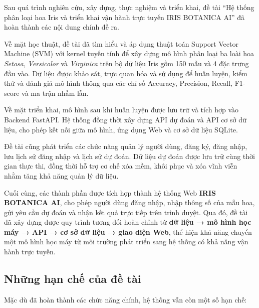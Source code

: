 \documentclass[14pt]{extarticle}
\begin{document}
\noindent Sau quá trình nghiên cứu, xây dựng, thực nghiệm và triển khai, đề tài ``Hệ thống phân loại hoa Iris và triển khai vận hành trực tuyến IRIS BOTANICA AI'' đã hoàn thành các nội dung chính đề ra.

\noindent Về mặt học thuật, đề tài đã tìm hiểu và áp dụng thuật toán Support Vector Machine (SVM) với kernel tuyến tính để xây dựng mô hình phân loại ba loài hoa \textit{Setosa}, \textit{Versicolor} và \textit{Virginica} trên bộ dữ liệu Iris gồm 150 mẫu và 4 đặc trưng đầu vào. Dữ liệu được khảo sát, trực quan hóa và sử dụng để huấn luyện, kiểm thử và đánh giá mô hình thông qua các chỉ số Accuracy, Precision, Recall, F1-score và ma trận nhầm lẫn.

\noindent Về mặt triển khai, mô hình sau khi huấn luyện được lưu trữ và tích hợp vào Backend FastAPI. Hệ thống đồng thời xây dựng API dự đoán và API cơ sở dữ liệu, cho phép kết nối giữa mô hình, ứng dụng Web và cơ sở dữ liệu SQLite.

\noindent Đề tài cũng phát triển các chức năng quản lý người dùng, đăng ký, đăng nhập, lưu lịch sử đăng nhập và lịch sử dự đoán. Dữ liệu dự đoán được lưu trữ cùng thời gian thực thi, đồng thời hỗ trợ cơ chế xóa mềm, khôi phục và xóa vĩnh viễn nhằm tăng khả năng quản lý dữ liệu.

\noindent Cuối cùng, các thành phần được tích hợp thành hệ thống Web \textbf{IRIS BOTANICA AI}, cho phép người dùng đăng nhập, nhập thông số của mẫu hoa, gửi yêu cầu dự đoán và nhận kết quả trực tiếp trên trình duyệt. Qua đó, đề tài đã xây dựng được quy trình tương đối hoàn chỉnh từ \textbf{dữ liệu → mô hình học máy → API → cơ sở dữ liệu → giao diện Web}, thể hiện khả năng chuyển một mô hình học máy từ môi trường phát triển sang hệ thống có khả năng vận hành trực tuyến.

	
\subsection{Những hạn chế của đề tài}

\noindent Mặc dù đã hoàn thành các chức năng chính, hệ thống vẫn còn một số hạn chế:
\end{document}
